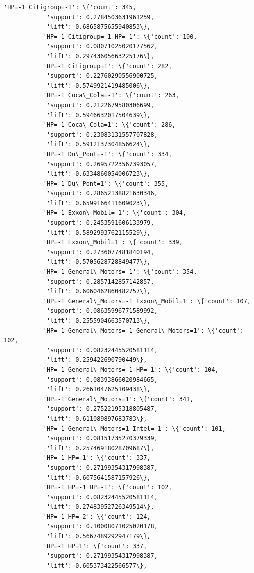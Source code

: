 \documentclass[11pt]{article}
\begin{document}
\begin{Verbatim}[commandchars=\\\{\}]
           'HP=-1 Citigroup=-1': \{'count': 345,
            'support': 0.2784503631961259,
            'lift': 0.6865875655940853\},
           'HP=-1 Citigroup=-1 HP=-1': \{'count': 100,
            'support': 0.08071025020177562,
            'lift': 0.29743605663225176\},
           'HP=-1 Citigroup=1': \{'count': 282,
            'support': 0.22760290556900725,
            'lift': 0.5749921419485006\},
           'HP=-1 Coca\_Cola=-1': \{'count': 263,
            'support': 0.2122679580306699,
            'lift': 0.5946632017504639\},
           'HP=-1 Coca\_Cola=1': \{'count': 286,
            'support': 0.23083131557707828,
            'lift': 0.5912137304856624\},
           'HP=-1 Du\_Pont=-1': \{'count': 334,
            'support': 0.26957223567393057,
            'lift': 0.6334860054006723\},
           'HP=-1 Du\_Pont=1': \{'count': 355,
            'support': 0.28652138821630346,
            'lift': 0.6599166411609023\},
           'HP=-1 Exxon\_Mobil=-1': \{'count': 304,
            'support': 0.2453591606133979,
            'lift': 0.5892993762115529\},
           'HP=-1 Exxon\_Mobil=1': \{'count': 339,
            'support': 0.2736077481840194,
            'lift': 0.5705628728849477\},
           'HP=-1 General\_Motors=-1': \{'count': 354,
            'support': 0.2857142857142857,
            'lift': 0.6060462860482757\},
           'HP=-1 General\_Motors=-1 Exxon\_Mobil=1': \{'count': 107,
            'support': 0.08635996771589992,
            'lift': 0.2555904663570713\},
           'HP=-1 General\_Motors=-1 General\_Motors=1': \{'count': 102,
            'support': 0.08232445520581114,
            'lift': 0.259422690790449\},
           'HP=-1 General\_Motors=-1 HP=-1': \{'count': 104,
            'support': 0.08393866020984665,
            'lift': 0.2661047625109438\},
           'HP=-1 General\_Motors=1': \{'count': 341,
            'support': 0.27522195318805487,
            'lift': 0.611089897683783\},
           'HP=-1 General\_Motors=1 Intel=-1': \{'count': 101,
            'support': 0.08151735270379339,
            'lift': 0.25746918028709687\},
           'HP=-1 HP=-1': \{'count': 337,
            'support': 0.27199354317998387,
            'lift': 0.6075641587157926\},
           'HP=-1 HP=-1 HP=-1': \{'count': 102,
            'support': 0.08232445520581114,
            'lift': 0.27483952726349514\},
           'HP=-1 HP=-2': \{'count': 124,
            'support': 0.10008071025020178,
            'lift': 0.5667489292947179\},
           'HP=-1 HP=1': \{'count': 337,
            'support': 0.27199354317998387,
            'lift': 0.605373422566577\},

\end{Verbatim}
\end{document}
